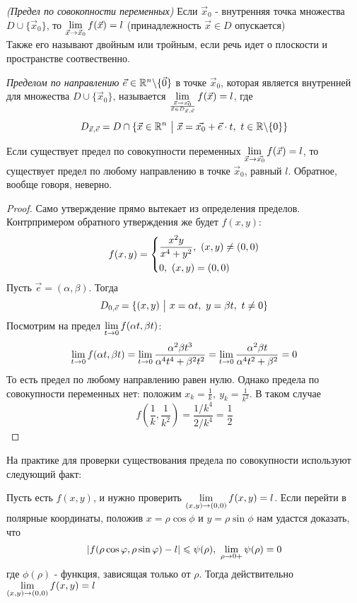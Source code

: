 \begin{definition}
	\textit{(Предел по совокопности переменных)}
	Если $\vec{x}_0$ - внутренняя точка множества $D \cup \{\vec{x}_0\}$, то $\lim\limits_{\vec{x} \to \vec{x}_0} f(\vec{x}) = l$ (принадлежность $\vec{x} \in D$ опускается) \\
	Также его называют двойным или тройным, если речь идет о плоскости и пространстве соотвественно.
\end{definition}
\begin{definition}
	\textit{Пределом по направлению} $\vec{e} \in \mathbb{R}^n \backslash \{\vec{0}\}$ в точке $\vec{x}_0$, которая является внутренней для множества $D \cup \{\vec{x}_0\}$, называется
	$\lim\limits_{\vec{x} \to \vec{x_0} \over \vec{x} \in D_{\vec{x}, \vec{e}}} f(\vec{x}) = l$, где	\[
	D_{\vec{x}, \vec{e}} = D \cap \{\vec{x} \in \mathbb{R}^n \ \big|\  \vec{x} = \vec{x_0} + \vec{e} \cdot t,\ t \in \mathbb{R} \backslash \{0\}\}
	\]
\end{definition}

\begin{theorem}
	Если существует предел по совокупности переменных $\lim\limits_{\vec{x} \to \vec{x_0}} f(\vec{x}) = l$, то существует предел по любому направлению в точке $\vec{x}_0$, равный $l$. Обратное, вообще говоря, неверно.
\end{theorem}

\begin{proof}
	Само утверждение прямо вытекает из определения  пределов. Контрпримером обратного утверждения же будет $f(x, y)$:
	\[
		f(x, y) = \left\{\begin{aligned}
			&{\frac{x^2 y}{x^4 + y^2},\ (x, y) \neq (0, 0)}
			\\
			&{0,\ (x, y) = (0, 0)}
		\end{aligned}\right.
	\]
	Пусть $\vec{e} = (\alpha, \beta)$. Тогда
	\[
		D_{0, \vec{e}} = \{(x, y) \ \big|\  x = \alpha t,\ y = \beta t,\ t \neq 0\}
	\]
	Посмотрим на предел $\lim\limits_{t \to 0} f(\alpha t, \beta t)$:
	\[
		\lim\limits_{t \to 0} f(\alpha t, \beta t) = \lim\limits_{t \to 0} \frac{\alpha^2 \beta t^3}{\alpha^4 t^4 + \beta^2 t^2} = \lim\limits_{t \to 0} \frac{\alpha^2 \beta t}{\alpha^4 t^2 + \beta^2} = 0
	\]
	То есть предел по любому направлению равен нулю. Однако предела по совокупности переменных нет: положим $x_k = \frac{1}{k},\ y_k = \frac{1}{k^2}$. В таком случае
	\[
		f\left(\frac{1}{k}, \frac{1}{k^2}\right) = \frac{1 / k^4}{2 / k^4} = \frac{1}{2}
	\]
\end{proof}

\begin{addition}
	На практике для проверки существования предела по совокупности используют следующий факт:
	
	Пусть есть $f(x, y)$, и нужно проверить $\lim\limits_{(x, y) \to (0, 0)} f(x, y) = l$. Если перейти в полярные координаты, положив $x = \rho \cos \phi$ и $y = \rho \sin \phi$ нам удастся доказать, что
	\[
		|f(\rho \cos\varphi, \rho \sin\varphi) - l| \leqslant \psi(\rho),\ \lim\limits_{\rho \to 0+} \psi(\rho) = 0
	\]
	где $\phi(\rho)$ - функция, зависящая только от $\rho$. Тогда действительно $\lim\limits_{(x, y) \to (0, 0)} f(x, y) = l$
\end{addition}

